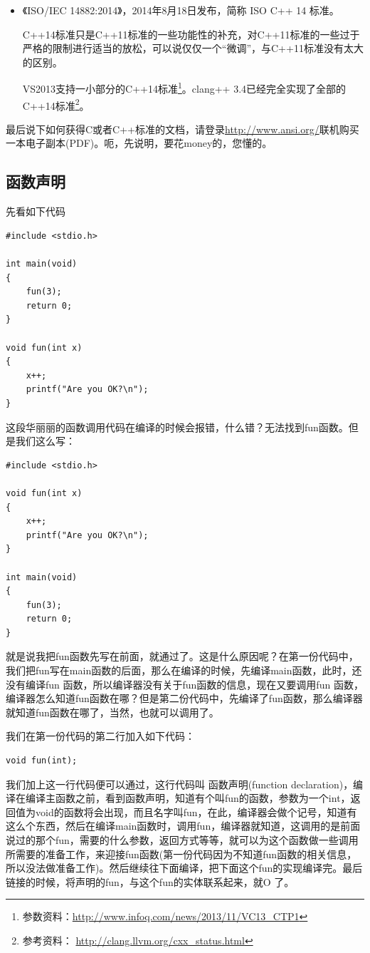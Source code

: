 \documentclass[11pt,twoside,a4paper,titlepage]{article}	%
\newcommand{\kw}[1]{\textcolor[rgb]{0.0,0.0,0.63}{ #1}}
\begin{document}
\begin{itemize}
\item 《ISO/IEC 14882:2014》，2014年8月18日发布，简称 ISO C++ 14 标准。

C++14标准只是C++11标准的一些功能性的补充，对C++11标准的一些过于严格的限制进行适当的放松，可以说仅仅一个“微调”，与C++11标准没有太大的区别。

VS2013支持一小部分的C++14标准\footnote{参数资料：\url{http://www.infoq.com/news/2013/11/VC13_CTP1} }。clang++ 3.4已经完全实现了全部的C++14标准\footnote{参考资料： \url{http://clang.llvm.org/cxx_status.html} }。

\end{itemize}

最后说下如何获得C或者C++标准的文档，请登录\url{http://www.ansi.org/}联机购买一本电子副本(PDF)。呃，先说明，要花money的，您懂的。

\subsection{函数声明}
先看如下代码

\begin{lstlisting}
#include <stdio.h>

int main(void)
{
	fun(3);
	return 0;
}

void fun(int x)
{
	x++;
	printf("Are you OK?\n");
}
\end{lstlisting}

这段华丽丽的函数调用代码在编译的时候会报错，什么错？无法找到fun函数。但是我们这么写：

\begin{lstlisting}
#include <stdio.h>

void fun(int x)
{
	x++;
	printf("Are you OK?\n");
}

int main(void)
{
	fun(3);
	return 0;
}
\end{lstlisting}

就是说我把fun函数先写在前面，就通过了。这是什么原因呢？在第一份代码中，我们把fun写在main函数的后面，那么在编译的时候，先编译main函数，此时，还没有编译fun 函数，所以编译器没有关于fun函数的信息，现在又要调用fun 函数，编译器怎么知道fun函数在哪？但是第二份代码中，先编译了fun函数，那么编译器就知道fun函数在哪了，当然，也就可以调用了。

我们在第一份代码的第二行加入如下代码：
\begin{lstlisting}
void fun(int);
\end{lstlisting}

我们加上这一行代码便可以通过，这行代码叫\kw{函数声明(function declaration)}，编译在编译主函数之前，看到函数声明，知道有个叫fun的函数，参数为一个int，返回值为void的函数将会出现，而且名字叫fun，在此，编译器会做个记号，知道有这么个东西，然后在编译main函数时，调用fun，编译器就知道，这调用的是前面说过的那个fun，需要的什么参数，返回方式等等，就可以为这个函数做一些调用所需要的准备工作，来迎接fun函数(第一份代码因为不知道fun函数的相关信息，所以没法做准备工作)。然后继续往下面编译，把下面这个fun的实现编译完。最后链接的时候，将声明的fun，与这个fun的实体联系起来，就O 了。
\end{document}
